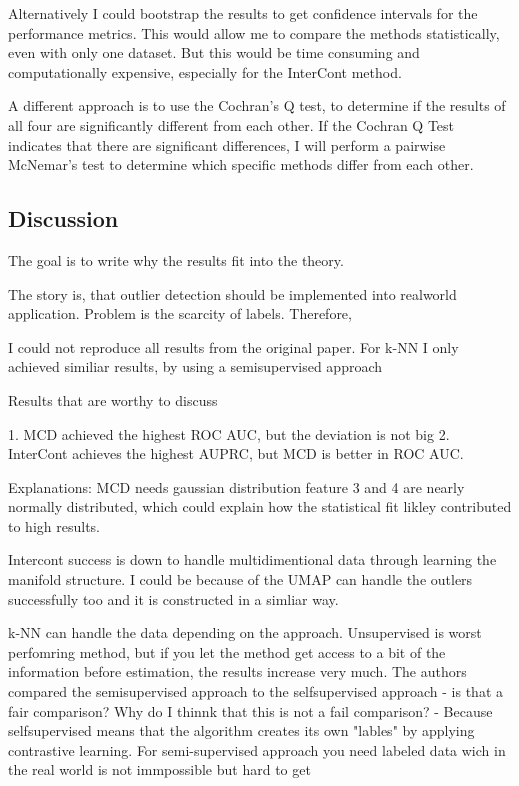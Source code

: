 Alternatively I could bootstrap the results to get confidence intervals for the performance metrics.
This would allow me to compare the methods statistically, even with only one dataset.
But this would be time consuming and computationally expensive, especially for the InterCont method.

A different approach is to use the Cochran's Q test, to determine if the results of all four are significantly different from each other.
If the Cochran Q Test indicates that there are significant differences, I will perform a pairwise McNemar's test to determine which specific methods differ from each other.














\subsection{Discussion}
The goal is to write why the results fit into the theory.


The story is, that outlier detection should be implemented into realworld application.
Problem is the scarcity of labels. 
Therefore, 

I could not reproduce all results from the original paper.
For k-NN I only achieved similiar results, by using a semisupervised approach

Results that are worthy to discuss

1. MCD achieved the highest ROC AUC, but the deviation is not big
2. InterCont achieves the highest AUPRC, but MCD is better in ROC AUC.

Explanations:
MCD needs gaussian distribution feature 3 and 4 are nearly normally distributed, which could explain how the statistical fit likley contributed to high results.


Intercont success is down to handle multidimentional data through learning the manifold structure.
I could be because of the UMAP can handle the outlers successfully too and it is constructed in a simliar way.


k-NN can handle the data depending on the approach.
Unsupervised is worst perfomring method, but if you let the method get access to a bit of the information before estimation, the results increase very much.
The authors compared the semisupervised approach to the selfsupervised approach - is that a fair comparison? 
Why do I thinnk that this is not a fail comparison? - Because selfsupervised means that the algorithm creates its own "lables" by applying contrastive learning.
For semi-supervised approach you need labeled data wich in the real world is not immpossible but hard to get 


